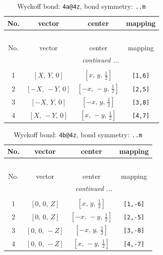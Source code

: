 \documentclass[fleqn,8pt]{jsarticle}
\begin{document}
\begin{longtable}{cccc}
\caption{Wyckoff bond: {\tt 4a@4z}, bond symmetry: {\tt ..m}}
 \\
 \hline \hline
No. & vector & center & mapping \\ \hline \endfirsthead

\multicolumn{3}{l}{\tablename\ \thetable{}} \\
 \hline \hline
No. & vector & center & mapping \\ \hline \endhead

 \hline \hline
\multicolumn{3}{r}{\footnotesize\it continued ...} \\ \endfoot

 \hline \hline
\multicolumn{3}{r}{} \\ \endlastfoot

1 & $\left[ X,\, Y,\, 0 \right]$ & $\left[ x,\, y,\, \frac{1}{2} \right]$ & {\tt [1,6]} \\ \hline
2 & $\left[ - X,\, - Y,\, 0 \right]$ & $\left[ - x,\, - y,\, \frac{1}{2} \right]$ & {\tt [2,5]} \\ \hline
3 & $\left[ - X,\, Y,\, 0 \right]$ & $\left[ - x,\, y,\, \frac{1}{2} \right]$ & {\tt [3,8]} \\ \hline
4 & $\left[ X,\, - Y,\, 0 \right]$ & $\left[ x,\, - y,\, \frac{1}{2} \right]$ & {\tt [4,7]} \\
\end{longtable}
\renewcommand{\arraystretch}{1.2}
\begin{longtable}{cccc}
\caption{Wyckoff bond: {\tt 4b@4z}, bond symmetry: {\tt ..m}}
 \\
 \hline \hline
No. & vector & center & mapping \\ \hline \endfirsthead

\multicolumn{3}{l}{\tablename\ \thetable{}} \\
 \hline \hline
No. & vector & center & mapping \\ \hline \endhead

 \hline \hline
\multicolumn{3}{r}{\footnotesize\it continued ...} \\ \endfoot

 \hline \hline
\multicolumn{3}{r}{} \\ \endlastfoot

1 & $\left[ 0,\, 0,\, Z \right]$ & $\left[ x,\, y,\, \frac{1}{2} \right]$ & {\tt [1,-6]} \\ \hline
2 & $\left[ 0,\, 0,\, Z \right]$ & $\left[ - x,\, - y,\, \frac{1}{2} \right]$ & {\tt [2,-5]} \\ \hline
3 & $\left[ 0,\, 0,\, - Z \right]$ & $\left[ - x,\, y,\, \frac{1}{2} \right]$ & {\tt [3,-8]} \\ \hline
4 & $\left[ 0,\, 0,\, - Z \right]$ & $\left[ x,\, - y,\, \frac{1}{2} \right]$ & {\tt [4,-7]} \\
\end{longtable}
\end{document}

